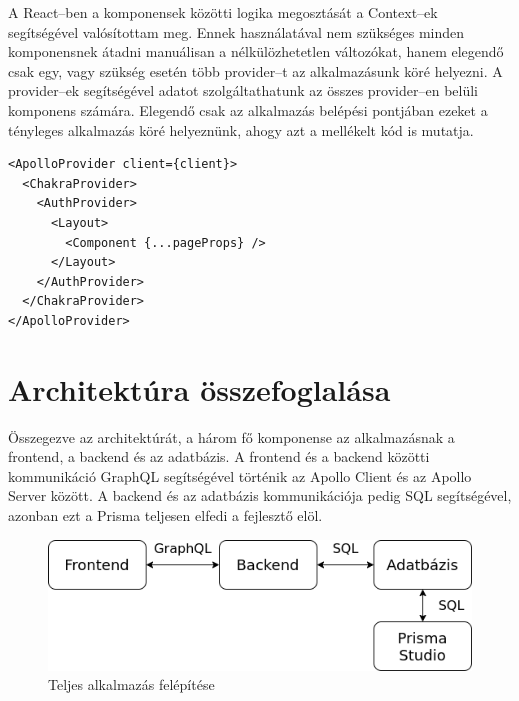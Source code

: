 A React–ben a komponensek közötti logika megosztását a Context–ek segítségével valósítottam meg.
Ennek használatával nem szükséges minden komponensnek átadni manuálisan a nélkülözhetetlen változókat, hanem elegendő csak egy, vagy szükség esetén több provider–t az alkalmazásunk köré helyezni.
A provider–ek segítségével adatot szolgáltathatunk az összes provider–en belüli komponens számára.
Elegendő csak az alkalmazás belépési pontjában ezeket a tényleges alkalmazás köré helyeznünk, ahogy azt a mellékelt kód is mutatja.

\begin{lstlisting}[style=ES6, caption=Frontendhez használt provider–ek]    
<ApolloProvider client={client}>
  <ChakraProvider>
    <AuthProvider>
      <Layout>
        <Component {...pageProps} />
      </Layout>
    </AuthProvider>
  </ChakraProvider>
</ApolloProvider>
\end{lstlisting}


\section{Architektúra összefoglalása}
Összegezve az architektúrát, a három fő komponense az alkalmazásnak a frontend, a backend és az adatbázis.
A frontend és a backend közötti kommunikáció GraphQL segítségével történik az Apollo Client és az Apollo Server között.
A backend és az adatbázis kommunikációja pedig SQL segítségével, azonban ezt a Prisma teljesen elfedi a fejlesztő elöl.

\begin{figure}[!ht]
  \centering
  \includegraphics[width=150mm, keepaspectratio]{figures/architecture.png}
  \caption{Teljes alkalmazás felépítése}
  \label{fig:architecture}
\end{figure}